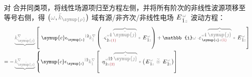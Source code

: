 对  合并同类项，将线性场源项归至方程左侧，并将所有阶次的非线性波源项移至等号右侧，得 $\left( \mathcolor{gray}{\omega}, \mathcolor{gray}{\bar{k}_{\symup{\rho}}} \right)$ 域有源/非齐次/非线性电场 $\Xint{\mathcolor{gray}{-}}{295}{E}^{\;\!\mathcolor{gray}{\omega}}_{\;\! \hat{1} \mathcolor{gray}{z}}$ 波动方程：
\begin{subequations}
\begin{align}
	&\mathcolor{gray}{\underbrace{k^\nabla_{\check{\symup{\jmath}}}}} \left[~ {\symup{c}} \epsilon^{\hphantom{\symup{\iota}}\mathcolor{gray}{\dot{1}}\dot{2}}_{\symup{\iota}} \mathcolor{gray}{k^\nabla_{\dot{1}}} \left( \Xint{\begin{smallmatrix} ~ \\ {}^{}_{\mathcolor{gray}{-}} \\ ~ \end{smallmatrix}}{13}{\varsigma}^{\;\! \mathcolor{gray}{\omega} \hat{1} \;\! \mathcolor{gray}{\overbrace{\check{\symup{\jmath}}}}}_{\;\! \dot{2} \mathcolor{gray}{z} \textcolor{Maroon}{(1)}} \mathcolor{gray}{*} \Xint{\mathcolor{gray}{-}}{295}{E}^{\;\!\mathcolor{gray}{\omega}}_{\;\! \hat{1} \mathcolor{gray}{z}} \right) + \mathbb{i} \mathcolor{gray}{\omega} \Xint{\begin{smallmatrix} ~ \\ {}^{}_{\mathcolor{gray}{-}} \\ ~ \end{smallmatrix}}{16}{\varepsilon}^{\;\! \mathcolor{gray}{\omega} \hat{1} \;\! \mathcolor{gray}{\overbrace{\check{\symup{\jmath}}}}}_{\;\! \symup{\iota} \mathcolor{gray}{z} \textcolor{Maroon}{(1)}} \mathcolor{gray}{*} \Xint{\mathcolor{gray}{-}}{295}{E}^{\;\!\mathcolor{gray}{\omega}}_{\;\! \hat{1} \mathcolor{gray}{z}} \right]  \label{eq:nonlinear-wave_wkrho} \\ = - &\mathcolor{gray}{\underbrace{k^\nabla_{\check{\symup{\jmath}}}}} \left\{ {\symup{c}} \epsilon^{\hphantom{\symup{\iota}}\mathcolor{gray}{\dot{1}}\dot{2}}_{\symup{\iota}} \mathcolor{gray}{k^\nabla_{\dot{1}}} \left[ \Xint{\begin{smallmatrix} ~ \\ {}^{}_{\mathcolor{gray}{-}} \\ ~ \end{smallmatrix}}{17}{\eta}^{\;\! \mathcolor{gray}{\omega} \hat{1} \hat{2} \;\! \mathcolor{gray}{\overbrace{\check{\symup{\jmath}}}}}_{\;\! \dot{2} \mathcolor{gray}{z} \textcolor{Maroon}{(2)}} \mathcolor{gray}{*} \left( \Xint{\mathcolor{gray}{-}}{295}{E}^{\;\!\mathcolor{gray}{\omega}}_{\;\! \hat{1} \mathcolor{gray}{z}} ~\mathcolor{gray}{\widetilde \circledast}~ \Xint{\mathcolor{gray}{-}}{295}{E}^{\;\!\mathcolor{gray}{\omega}}_{\;\! \hat{2} \mathcolor{gray}{z}} \right) \right] \right. \\ 

\end{align}
\end{subequations}
